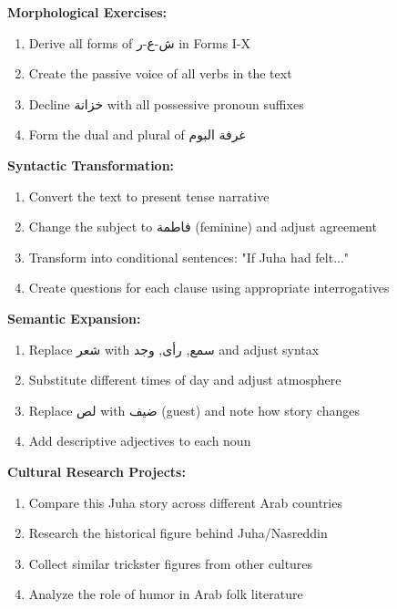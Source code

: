 \documentclass[letterpaper,12pt]{article}
\begin{document}
\begin{tcolorbox}[colback=boxcolor,colframe=headercolor,title=\textbf{Practice Activities},breakable]
\textbf{Morphological Exercises:}
\begin{enumerate}
\item Derive all forms of \textarabic{ش-ع-ر} in Forms I-X
\item Create the passive voice of all verbs in the text
\item Decline \textarabic{خزانة} with all possessive pronoun suffixes
\item Form the dual and plural of \textarabic{غرفة البوم}
\end{enumerate}

\textbf{Syntactic Transformation:}
\begin{enumerate}
\item Convert the text to present tense narrative
\item Change the subject to \textarabic{فاطمة} (feminine) and adjust agreement
\item Transform into conditional sentences: "If Juha had felt..."
\item Create questions for each clause using appropriate interrogatives
\end{enumerate}

\textbf{Semantic Expansion:}
\begin{enumerate}
\item Replace \textarabic{شعر} with \textarabic{سمع}, \textarabic{رأى}, \textarabic{وجد} and adjust syntax
\item Substitute different times of day and adjust atmosphere
\item Replace \textarabic{لص} with \textarabic{ضيف} (guest) and note how story changes
\item Add descriptive adjectives to each noun
\end{enumerate}

\textbf{Cultural Research Projects:}
\begin{enumerate}
\item Compare this Juha story across different Arab countries
\item Research the historical figure behind Juha/Nasreddin
\item Collect similar trickster figures from other cultures
\item Analyze the role of humor in Arab folk literature
\end{enumerate}
\end{tcolorbox}
\end{document}
